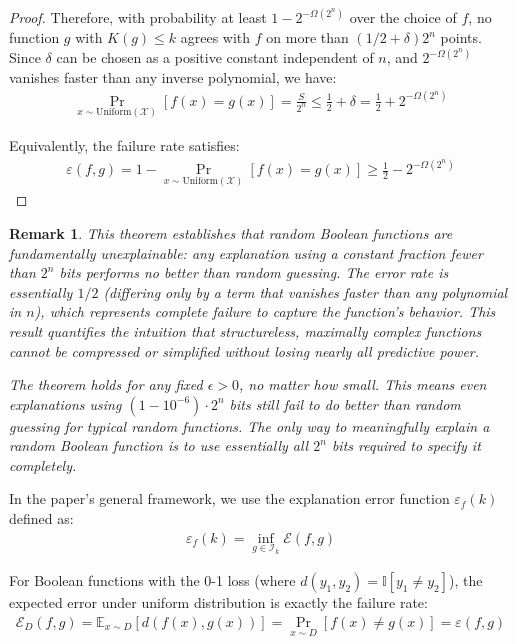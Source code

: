 \documentclass[11pt,letter,leqno]{article}
\newtheorem{remark}[theorem]{Remark}
\begin{document}
\begin{proof}
Therefore, with probability at least $1 - 2^{-\Omega(2^n)}$ over the choice of $f$, no function $g$ with $K(g) \leq k$ agrees with $f$ on more than $(1/2 + \delta)2^n$ points. Since $\delta$ can be chosen as a positive constant independent of $n$, and $2^{-\Omega(2^n)}$ vanishes faster than any inverse polynomial, we have:
\begin{align}
\Pr_{x \sim \text{Uniform}(\mathcal{X})}[f(x) = g(x)] = \frac{S}{2^n} \leq \frac{1}{2} + \delta = \frac{1}{2} + 2^{-\Omega(2^n)}
\end{align}

Equivalently, the failure rate satisfies:
\begin{align}
\varepsilon(f,g) = 1 - \Pr_{x \sim \text{Uniform}(\mathcal{X})}[f(x) = g(x)] \geq \frac{1}{2} - 2^{-\Omega(2^n)}
\end{align}
\end{proof}

\begin{remark}
This theorem establishes that random Boolean functions are fundamentally unexplainable: any explanation using a constant fraction fewer than $2^n$ bits performs no better than random guessing. The error rate is essentially $1/2$ (differing only by a term that vanishes faster than any polynomial in $n$), which represents complete failure to capture the function's behavior. This result quantifies the intuition that structureless, maximally complex functions cannot be compressed or simplified without losing nearly all predictive power.

The theorem holds for any fixed $\epsilon > 0$, no matter how small. This means even explanations using $(1 - 10^{-6}) \cdot 2^n$ bits still fail to do better than random guessing for typical random functions. The only way to meaningfully explain a random Boolean function is to use essentially all $2^n$ bits required to specify it completely.
\end{remark}

In the paper's general framework, we use the explanation error function $\varepsilon_f(k)$ defined as:
\begin{align}
\varepsilon_f(k) = \inf_{g \in \mathcal{I}_k} \mathcal{E}(f, g)
\end{align}

For Boolean functions with the 0-1 loss (where $d(y_1, y_2) = \mathbb{I}[y_1 \neq y_2]$), the expected error under uniform distribution is exactly the failure rate:
\begin{align}
\mathcal{E}_D(f, g) = \mathbb{E}_{x \sim D}[d(f(x), g(x))] = \Pr_{x \sim D}[f(x) \neq g(x)] = \varepsilon(f,g)
\end{align}
\end{document}
